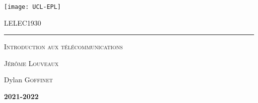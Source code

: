 \documentclass{customSynthesis}
\begin{document}

\begin{titlepage}
	\flushleft\texttt{[image: UCL-EPL]}\\
	\vspace*{2cm}
	\vspace*{\fill}
	\centering
	{\scshape\LARGE LELEC1930 \par}
	\vspace{0.4cm}
	{\color{clearBlue}\rule{0.7\textwidth}{1pt}\par}
	\vspace{0.5cm}
	{\scshape\Large Introduction aux télécommunications \par}
	\vspace{0.5cm}
	{\scshape\large Jérôme Louveaux\par}
	\vspace{1cm}
	{\scshape\large \par}
	{\Large\itshape\par}
	\vspace*{\fill}
	\vfill
	\vfill
	{\Large Dylan \textsc{Goffinet}\par}
	\vspace{0.5cm}
	{\Large\bfseries 2021-2022\par}
	{\large \par}
\end{titlepage}


\setcounter{tocdepth}{2} %
\tableofcontents
\thispagestyle{empty} %
\clearpage
{}




\end{document}
